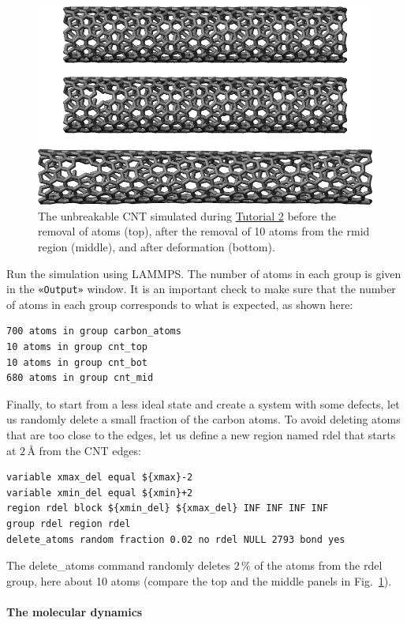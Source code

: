 \documentclass[9pt,tutorial]{livecoms}
\newcommand{\lmpcmd}[1]{\hspace{0pt}\colorbox{listing}{\textcolor{command}{\small{#1}}}\hspace{0pt}} %
\newcommand{\guicmd}[1]{\textcolor{command}{\texttt{«#1»}}} %
\begin{document}
\begin{figure}
\centering
\includegraphics[width=\linewidth]{CNT-unbreakable}
\caption{The unbreakable CNT simulated during \hyperref[carbon-nanotube-label]{Tutorial 2}
before the removal of atoms (top), after the removal of 10 atoms from the \lmpcmd{rmid}
region (middle), and after deformation (bottom).}
\label{fig:CNT-unbreakable}
\end{figure}

Run the simulation using LAMMPS.  The number of atoms in each group is given in
the \guicmd{Output} window.  It is an important check to make sure that the number
of atoms in each group corresponds to what is expected, as shown here:
\begin{lstlisting}
700 atoms in group carbon_atoms
10 atoms in group cnt_top
10 atoms in group cnt_bot
680 atoms in group cnt_mid
\end{lstlisting}

Finally, to start from a less ideal state and create a system with some defects,
let us randomly delete a small fraction of the carbon atoms.  To avoid deleting
atoms that are too close to the edges, let us define a new region named \lmpcmd{rdel}
that starts at $2\,\text{\AA{}}$ from the CNT edges:
\begin{lstlisting}
variable xmax_del equal ${xmax}-2
variable xmin_del equal ${xmin}+2
region rdel block ${xmin_del} ${xmax_del} INF INF INF INF
group rdel region rdel
delete_atoms random fraction 0.02 no rdel NULL 2793 bond yes
\end{lstlisting}
The \lmpcmd{delete\_atoms} command randomly deletes $2\,\%$ of the atoms from
the \lmpcmd{rdel} group, here about 10 atoms (compare the top
and the middle panels in Fig.~\ref{fig:CNT-unbreakable}).

\paragraph{The molecular dynamics}
\end{document}
